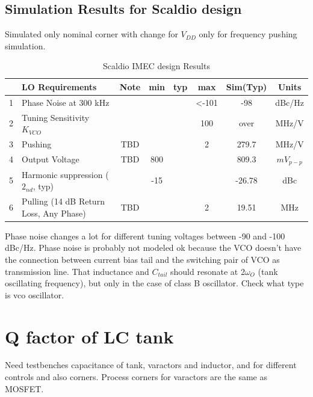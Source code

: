 \documentclass{article}
\begin{document}
\subsection{Simulation Results for Scaldio design}

Simulated only nominal corner with change for $V_{DD}$ only for frequency pushing simulation. 

\begin{table}[ht]
	\centering
	\begin{tabular}{|c|l|c|c|c|c|c|c|}
		\hline
		& LO Requirements & Note & min & typ & max & Sim(Typ) & Units \\
		\hline
		1 & Phase Noise at 300 kHz &  &  &  & <-101 & -98 & dBc/Hz  \\ 
		\hline
		2 & Tuning Sensitivity $K_{VCO}$ &  &  &  & 100 & over & MHz/V  \\ 
		\hline
		3 & Pushing & TBD &  &  & 2  & 279.7 & MHz/V  \\ 
		\hline
		4 & Output Voltage & TBD & 800 &  & & 809.3 & $mV_{p-p}$  \\ 
		\hline
		5 & Harmonic suppression ($2_{nd}$, typ) &  & -15 &  & & -26.78 & dBc  \\ 
		\hline
		6 & Pulling (14 dB Return Loss, Any Phase) & TBD &  &  & 2  & 19.51 & MHz  \\ 
		\hline
	\end{tabular}
	\label{table-ScaldioResults}
	\caption{Scaldio IMEC design Results}
\end{table}

Phase noise changes a lot for different tuning voltages between -90 and -100 dBc/Hz. Phase noise is probably not modeled ok because the VCO doesn't have the connection between current bias tail and the switching pair of VCO as transmission line. That inductance and $C_{tail}$ should resonate at 2$\omega_O$ (tank oscillating frequency), but only in the case of class B oscillator. Check what type is vco oscillator. %

\newpage

\section{Q factor of LC tank}

Need testbenches capacitance of tank, varactors and inductor, and for different controls and also corners. Process corners for varactors are the same as MOSFET.
\end{document}
